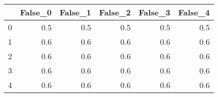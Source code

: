 \begin{tabular}{lrrrrr}
\toprule
{} &  False\_0 &  False\_1 &  False\_2 &  False\_3 &  False\_4 \\ \hline
\midrule
0 &      0.5 &      0.5 &      0.5 &      0.5 &      0.5 \\ \hline
1 &      0.6 &      0.6 &      0.6 &      0.6 &      0.6 \\ \hline
2 &      0.6 &      0.6 &      0.6 &      0.6 &      0.6 \\ \hline
3 &      0.6 &      0.6 &      0.6 &      0.6 &      0.6 \\ \hline
4 &      0.6 &      0.6 &      0.6 &      0.6 &      0.6 \\ \hline
\bottomrule
\end{tabular}
